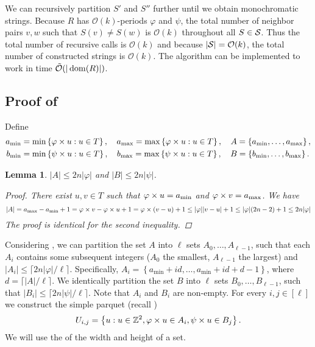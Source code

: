 \documentclass[11pt]{article}
\newcommand{\Z}{\mathbb{Z}}
\renewcommand{\O}{\mathcal{O}}
\newcommand{\tO}{\tilde{\mathcal{O}}}
\renewcommand{\phi}{\varphi}
\newcommand{\set}[1]{\left\lbrace #1 \right\rbrace}
\newcommand{\eq}[1]{\begin{align*} #1 \end{align*}}
\theoremstyle{plain}
\newtheorem{lemma}{Lemma}
\theoremstyle{definition}
\theoremstyle{remark}
\begin{document}
We can recursively partition $S'$ and $S''$ further until we obtain monochromatic strings.
Because $R$ has $\O(k)$-periods $\phi$ and $\psi$, the total number of neighbor pairs $v, w$ such that $S(v) \neq S(w)$ is $\O(k)$ throughout all $S \in \S$.
Thus the total number of recursive calls is $\O(k)$ and because $|\S| = \O(k)$, the total number of constructed strings is $\O(k)$.
The algorithm can be implemented to work in time $\tO(|\d{R}|)$.


\subsection{Proof of } \label{text_decomposition_proof}
Define
\eq{
	a_{\min} &= \min \set{\h{u} : u \in T}, \quad a_{\max} = \max \set{\h{u} : u \in T}, \quad A = \set{a_{\min}, \dots, a_{\max}}, \\
	b_{\min} &= \min \set{\s{u} : u \in T}, \quad b_{\max} = \max \set{\s{u} : u \in T}, \quad B = \set{b_{\min}, \dots, b_{\max}}.
}

\begin{lemma}\label{AB_size_bound}
	$|A| \le 2n|\phi|$ and $|B| \le 2n|\psi|$.
	\begin{proof}
		There exist $u, v \in T$ such that $\h{u} = a_{\min}$ and $\h{v} = a_{\max}$. We have
		$$|A| = a_{\max} - a_{\min} + 1 = \h{v} - \h{u} + 1 = \h{(v - u)} + 1 \le |\phi||v - u| + 1 \le |\phi|(2n - 2) + 1 \le 2n|\phi|$$
		The proof is identical for the second inequality.
	\end{proof}
\end{lemma}

Considering , we can partition the set $A$ into $\ell$ sets $A_0, \dots, A_{\ell - 1}$, such that each $A_i$ contains some subsequent integers ($A_0$ the smallest, $A_{\ell - 1}$ the largest) and $|A_i| \le \lceil 2n|\phi| / \ell \rceil$.
Specifically, 
$ A_i = \set{a_{\min} + id, \dots, a_{\min} + id + d - 1} $, where $d = \lceil |A| / \ell \rceil$.
We identically partition the set $B$ into $\ell$ sets $B_0, \dots, B_{\ell - 1}$, such that $|B_i| \le \lceil 2n|\psi| / \ell \rceil$.
Note that $A_i$ and $B_i$ are non-empty.
For every $i, j \in [\ell]$ we construct the simple parquet (recall )
$$ U_{i,j} = \set{u : u \in \Z^2, \h{u} \in A_i, \s{u} \in B_j}.$$
We will use the  of the width and height of a set.
\end{document}
